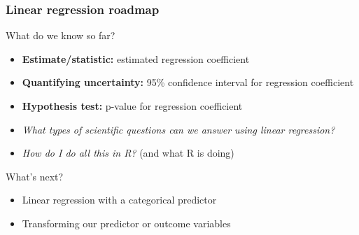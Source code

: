 \documentclass[12pt, 
hyperref={colorlinks=true, linkcolor=blue, urlcolor=cyan}]{beamer}
\begin{document}
\begin{frame}
\frametitle{Linear regression roadmap}
\color{blue} What do we know so far? \color{black}%
\begin{itemize}
\item \textbf{Estimate/statistic:} estimated regression coefficient
\item \textbf{Quantifying uncertainty:} 95\% confidence interval for regression coefficient
\item \textbf{Hypothesis test:} p-value for regression coefficient 
\item \textit{What types of scientific questions can we answer using linear regression?}
\item \textit{How do I do all this in R?} (and what R is doing)
\end{itemize}

\color{blue} What's next?
\begin{itemize}
\item Linear regression with a categorical predictor
\item Transforming our predictor or outcome variables
\end{itemize}

\end{frame}
\end{document}

